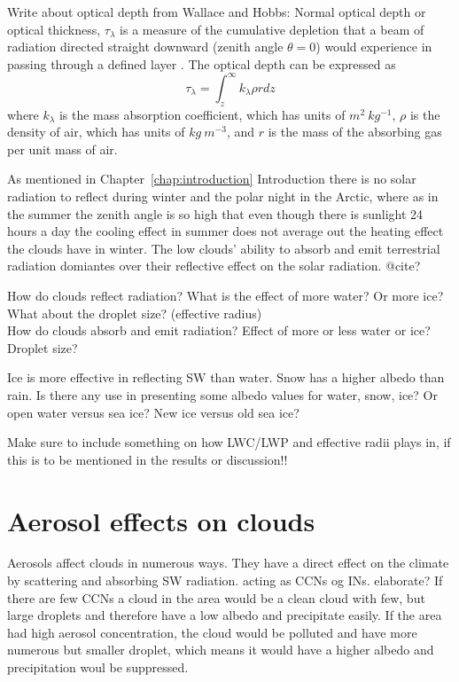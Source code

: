 Write about optical depth from Wallace and Hobbs: Normal optical depth or optical thickness, $\tau_{\lambda}$ is a measure of the cumulative depletion that a beam of radiation directed straight downward (zenith angle $\theta = 0$) would experience in passing through a defined layer \citep{WallaceHobbs2006}. The optical depth can be expressed as
\begin{equation}
\tau_{\lambda} = \int_z^{\infty} k_{\lambda} \rho r dz
\end{equation}
where $k_{\lambda}$ is the mass absorption coefficient, which has units of $m^2~kg^{-1}$, $\rho$ is the density of air, which has units of $kg~m^{-3}$, and $r$ is the mass of the absorbing gas per unit mass of air.



As mentioned in Chapter~\ref{chap:introduction} Introduction there is no solar radiation to reflect during winter and the polar night in the Arctic, where as in the summer the zenith angle is so high that even though there is sunlight 24 hours a day the cooling effect in summer does not average out the heating effect the clouds have in winter. The low clouds' ability to absorb and emit terrestrial radiation domiantes over their reflective effect on the solar radiation. @cite?

How do clouds reflect radiation? What is the effect of more water? Or more ice? What about the droplet size? (effective radius)\\
How do clouds absorb and emit radiation? Effect of more or less water or ice? Droplet size?

Ice is more effective in reflecting SW than water. Snow has a higher albedo than rain. Is there any use in presenting some albedo values for water, snow, ice? Or open water versus sea ice? New ice versus old sea ice?

Make sure to include something on how LWC/LWP and effective radii plays in, if this is to be mentioned in the results or discussion!!

\section{Aerosol effects on clouds}
Aerosols affect clouds in numerous ways. They have a direct effect on the climate by scattering and absorbing SW radiation. acting as CCNs og INs. elaborate?
If there are few CCNs a cloud in the area would be a clean cloud with few, but large droplets and therefore have a low albedo and precipitate easily. If the area had high aerosol concentration, the cloud would be polluted and have more numerous but smaller droplet, which means it would have a higher albedo and precipitation woul be suppressed. 

